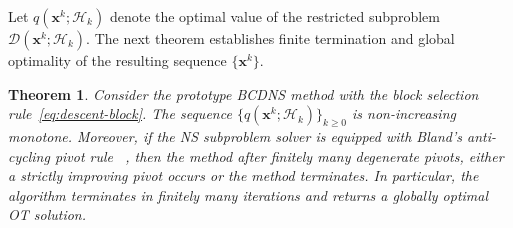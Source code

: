 \documentclass[12pt,a4paper]{article}
\newtheorem{theorem}{Theorem} %
\begin{document}
\medskip
Let $q(\mathbf{x}^k;\mathcal{H}_k)$ denote the optimal value of the restricted subproblem
$\mathcal{D}(\mathbf{x}^k;\mathcal{H}_k)$. The next theorem establishes finite termination and global optimality of the resulting sequence \(\{\mathbf{x}^{k}\}\).



\begin{theorem}\label{thm:proto_monotone_finite}
Consider the prototype BCDNS method with the block selection rule~\eqref{eq:descent-block}.
The sequence $\{q(\mathbf{x}^k;\mathcal{H}_k)\}_{k\ge 0}$ is non-increasing monotone.
Moreover, if the NS subproblem solver is equipped with Bland's anti-cycling pivot rule
~\cite{bland1977new}, then the method after finitely many degenerate pivots, either a strictly improving pivot occurs or the method terminates. In particular, the algorithm terminates in finitely many iterations and returns a globally optimal OT solution.
\end{theorem}
\end{document}
